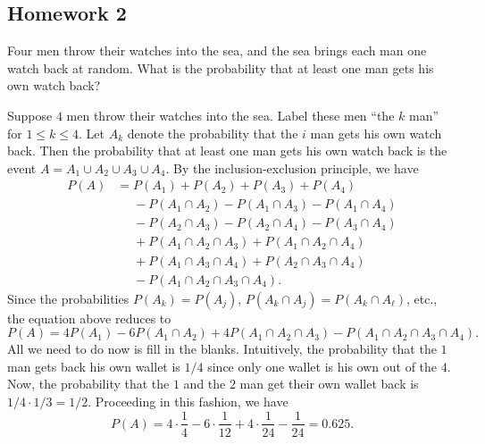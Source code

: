 \subsection{Homework 2}
\begin{problem}[Handout 2, \# 5]
  Four men throw their watches into the sea, and the sea brings each man
  one watch back at random. What is the probability that at least one man
  gets his own watch back?
\end{problem}
\begin{solution*}
  Suppose \(4\) men throw their watches into the sea. Label these men ``the
  \(k\) man'' for \(1\leq k\leq 4\). Let \(A_k\) denote the
  probability that the \(i\) man gets his own watch back. Then
  the probability that at least one man gets his own watch back is the
  event \(A=A_1\cup A_2\cup A_3\cup A_4\). By the inclusion-exclusion
  principle, we have
  \begin{equation}
    \label{eq:inclusion-exclusion-4}
    \begin{aligned}
      P(
      A)&=P(A_1)+P(A_2)+P(A_3)+P(A_4)\\
      &\phantom{{}={}}-P(A_1\cap A_2)-P(A_1\cap A_3)-P(A_1\cap A_4)\\
      &\phantom{{}={}}-P(A_2\cap A_3)-P(A_2\cap A_4)-P(A_3\cap A_4)\\
      &\phantom{{}={}}+P(A_1\cap A_2\cap A_3)+P(A_1\cap A_2\cap A_4)\\
      &\phantom{{}={}}+P(A_1\cap A_3\cap A_4)+P(A_2\cap A_3\cap A_4)\\
      &\phantom{{}={}}-P(A_1\cap A_2\cap A_3\cap A_4).
    \end{aligned}
  \end{equation}
  Since the probabilities \(P(A_k)=P(A_j)\), \(P(A_k\cap A_j)=P(A_k\cap
  A_\ell)\), etc., the equation above reduces to
  \[
    P(A)=4P(A_1)-6P(A_1\cap A_2)+4P(A_1\cap A_2\cap A_3)-P(A_1\cap A_2\cap
    A_3\cap A_4).
  \]
  All we need to do now is fill in the blanks. Intuitively, the probability
  that the \(1\) man gets back his own wallet is \(1/4\) since
  only one wallet is his own out of the \(4\). Now, the probability that
  the \(1\) and the \(2\) man get their own wallet
  back is \(1/4\cdot1/3=1/2\). Proceeding in this fashion, we have
  \[
    P(A)=4\cdot\frac{1}{4}-6\cdot\frac{1}{12}+4\cdot\frac{1}{24}-\frac{1}{24}
    =0.625.
  \]
\end{solution*}

